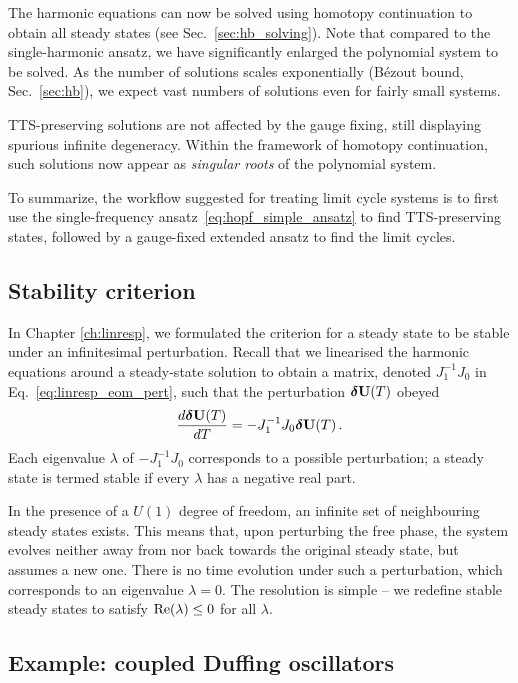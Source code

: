 The harmonic equations can now be solved using homotopy continuation to obtain all steady states (see Sec.~\ref{sec:hb_solving}). Note that compared to the single-harmonic ansatz, we have significantly enlarged the polynomial system to be solved. As the number of solutions scales exponentially (B\'{e}zout bound, Sec.~\ref{sec:hb}), we expect vast numbers of solutions even for fairly small systems. 

TTS-preserving solutions are not affected by the gauge fixing, still displaying spurious infinite degeneracy. Within the framework of homotopy continuation, such solutions now appear as \textit{singular roots} of the polynomial system.

To summarize, the workflow suggested for treating limit cycle systems is to first use the single-frequency ansatz~\eqref{eq:hopf_simple_ansatz} to find TTS-preserving states, followed by a gauge-fixed extended ansatz to find the limit cycles.

\subsection{Stability criterion}
In Chapter \ref{ch:linresp}, we formulated the criterion for a steady state to be stable under an infinitesimal perturbation. Recall that we linearised the harmonic equations around a steady-state solution to obtain a matrix, denoted $J_1^{-1} J_0$ in Eq.~\eqref{eq:linresp_eom_pert}, such that the perturbation $\boldsymbol{\delta} \vb{U}(T)$ obeyed
\begin{equation}
\frac{d \boldsymbol{\delta} \vb{U}(T)}{d T} = -J_1^{-1} J_0 \boldsymbol{\delta} \vb{U}(T) \,.
\end{equation} 
Each eigenvalue $\lambda$ of  $-J_1^{-1} J_0$ corresponds to a possible perturbation; a steady state is termed stable if every $\lambda$ has a negative real part.

In the presence of a $U(1)$ degree of freedom, an infinite set of neighbouring steady states exists. This means that, upon perturbing the free phase, the system evolves neither away from nor back towards the original steady state, but assumes a new one. There is no time evolution under such a perturbation, which corresponds to an eigenvalue $\lambda = 0$. The resolution is simple -- we redefine stable steady states to satisfy $\text{Re} (\lambda) \leq 0$ for all $\lambda$. 

\subsection{Example: coupled Duffing oscillators} \label{sec:hopf_example}

